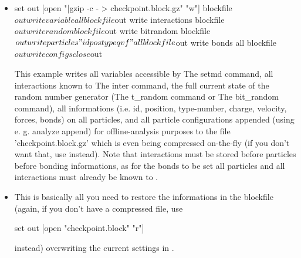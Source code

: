 \begin{itemize}
 \item
\begin{code}
set out [open "|gzip -c - > checkpoint.block.gz" "w"]
blockfile $out write variable all
blockfile $out write interactions
blockfile $out write random
blockfile $out write bitrandom
blockfile $out write particles "id pos type q v f" all
blockfile $out write bonds all
blockfile $out write configs
close $out 
\end{code}

This example writes all variables accessible by The setmd command, all
interactions known to The inter command, the full current state of the
random number generator (The t\_random command or The bit\_random
command), all informations (i.e. id, position, type-number, charge,
velocity, forces, bonds) on all particles, and all particle
configurations appended (using e. g. analyze append) for
offline-analysis purposes to the file 'checkpoint.block.gz' which is
even being compressed on-the-fly (if you don't want that, use
instead).
Note that interactions must be stored before particles before bonding
informations, as for the bonds to be set all particles and all
interactions must already be known to \es{}.

 \item
{}
This is basically all you need to restore the informations in the
blockfile (again, if you don't have a compressed file, use
\begin{code}
set out [open "checkpoint.block" "r"]
\end{code}
instead) overwriting the current settings in \es{}.
\end{itemize}


